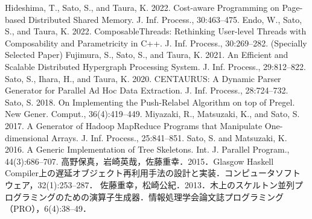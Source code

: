 \documentclass[dvipdfmx]{jsarticle}
\begin{document}
\newpage
\begin{thebibliography}{100}
  Hideshima, T., Sato, S., and Taura, K. 2022. Cost-aware Programming on Page-based Distributed Shared Memory. J. Inf. Process., 30:463–475.
  Endo, W., Sato, S., and Taura, K. 2022. ComposableThreads: Rethinking User-level Threads with Composability and Parametricity in C++. J. Inf. Process., 30:269–282. (Specially Selected Paper)
  Fujimura, S., Sato, S., and Taura, K. 2021. An Efficient and Scalable Distributed Hypergraph Processing System. J. Inf. Process., 29:812–822.
  Sato, S., Ihara, H., and Taura, K. 2020. CENTAURUS: A Dynamic Parser Generator for Parallel Ad Hoc Data Extraction. J. Inf. Process., 28:724–732.
  Sato, S. 2018. On Implementing the Push-Relabel Algorithm on top of Pregel. New Gener. Comput., 36(4):419–449.
  Miyazaki, R., Matsuzaki, K., and Sato, S. 2017. A Generator of Hadoop MapReduce Programs that Manipulate One-dimensional Arrays. J. Inf. Process., 25:841–851.
  Sato, S. and Matsuzaki, K. 2016. A Generic Implementation of Tree Skeletons. Int. J. Parallel Program., 44(3):686–707.
  高野保真，岩崎英哉，佐藤重幸．2015．Glasgow Haskell Compiler上の遅延オブジェクト再利用手法の設計と実装．コンピュータソフトウェア，32(1):253–287．
  佐藤重幸，松崎公紀．2013．木上のスケルトン並列プログラミングのための演算子生成器．情報処理学会論文誌プログラミング（PRO），6(4):38–49．


\end{thebibliography}
\end{document}
